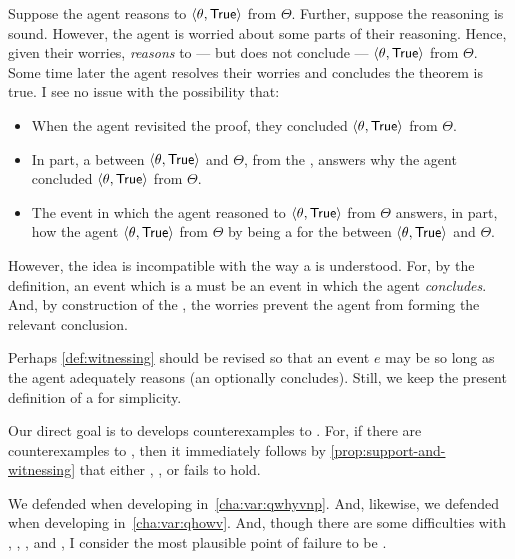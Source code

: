 \begin{note}
{    Suppose the agent reasons to \(\pv{\theta}{\valI{True}}\) from \(\Theta\).
    Further, suppose the \agents{} reasoning is sound.
    However, the agent is worried about some parts of their reasoning.
    Hence, given their worries, \emph{reasons} to --- but does not conclude --- \(\pv{\theta}{\valI{True}}\) from \(\Theta\).
    Some time later the agent resolves their worries and concludes the theorem is true.
    I see no issue with the possibility that:
    \begin{itemize}[noitemsep]
    \item
      When the agent revisited the proof, they concluded \(\pv{\theta}{\valI{True}}\) from \(\Theta\).
    \item
      In part, a \ros{} between \(\pv{\theta}{\valI{True}}\) and \(\Theta\), from the \agpe{}, answers why the agent concluded \(\pv{\theta}{\valI{True}}\) from \(\Theta\).
    \item
      The event in which the agent reasoned to \(\pv{\theta}{\valI{True}}\) from \(\Theta\) answers, in part, how the agent \(\pv{\theta}{\valI{True}}\) from \(\Theta\) by being a \wit{} for the \ros{} between \(\pv{\theta}{\valI{True}}\) and \(\Theta\).
    \end{itemize}
    However, the idea is incompatible with the way a  is understood.
    For, by the definition, an event which is a  must be an event in which the agent \emph{concludes}.
    And, by construction of the , the \agents{} worries prevent the agent from forming the relevant conclusion.

    Perhaps \autoref{def:witnessing} should be revised so that an event \(e\) may be \wit{} so long as the agent adequately reasons (an optionally concludes).
    Still,
    we keep the present definition of a \wit{} for simplicity.
  }

  Our direct goal is to develops counterexamples to \issueConstraint{}.
  For, if there are counterexamples to \issueConstraint{}, then it immediately follows by \autoref{prop:support-and-witnessing} that either \linkW{}, \linkH{}, or \issueInclusion{} fails to hold.

  We defended \linkW{} when developing \qWhyV{} in~\autoref{cha:var:qwhyvnp}.
  And, likewise, we defended \linkH{} when developing \qHowV{} in~\autoref{cha:var:qhowv}.
  And, though there are some difficulties with \qWhyV{}, \qHowV{}, \linkW{}, and \linkH{}, I consider the most plausible point of failure to be \issueInclusion{}.
\end{note}


